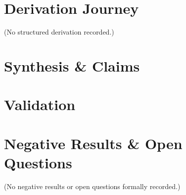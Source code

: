\documentclass[11pt,a4paper]{article}
\begin{document}
\section{Derivation Journey}

\noindent (No structured derivation recorded.)

\section{Synthesis \& Claims}

\section{Validation}

\begin{valbox}
\end{valbox}

\begin{valbox}
\end{valbox}

\section{Negative Results \& Open Questions}

\noindent (No negative results or open questions formally recorded.)
\end{document}
